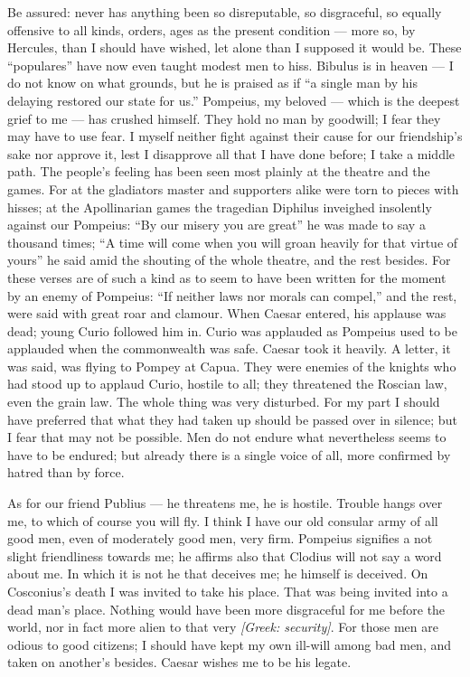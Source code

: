  Be assured: never has anything been so disreputable, so disgraceful, so equally offensive to all kinds, orders, ages as the present condition --- more so, by Hercules, than I should have wished, let alone than I supposed it would be. These ``populares'' have now even taught modest men to hiss. Bibulus is in heaven --- I do not know on what grounds, but he is praised as if ``a single man by his delaying restored our state for us.'' Pompeius, my beloved --- which is the deepest grief to me --- has crushed himself. They hold no man by goodwill; I fear they may have to use fear. I myself neither fight against their cause for our friendship's sake nor approve it, lest I disapprove all that I have done before; I take a middle path. The people's feeling has been seen most plainly at the theatre and the games. For at the gladiators master and supporters alike were torn to pieces with hisses; at the Apollinarian games the tragedian Diphilus inveighed insolently against our Pompeius: ``By our misery you are great'' he was made to say a thousand times; ``A time will come when you will groan heavily for that virtue of yours'' he said amid the shouting of the whole theatre, and the rest besides. For these verses are of such a kind as to seem to have been written for the moment by an enemy of Pompeius: ``If neither laws nor morals can compel,'' and the rest, were said with great roar and clamour. When Caesar entered, his applause was dead; young Curio followed him in. Curio was applauded as Pompeius used to be applauded when the commonwealth was safe. Caesar took it heavily. A letter, it was said, was flying to Pompey at Capua. They were enemies of the knights who had stood up to applaud Curio, hostile to all; they threatened the Roscian law, even the grain law. The whole thing was very disturbed. For my part I should have preferred that what they had taken up should be passed over in silence; but I fear that may not be possible. Men do not endure what nevertheless seems to have to be endured; but already there is a single voice of all, more confirmed by hatred than by force.

 As for our friend Publius --- he threatens me, he is hostile. Trouble hangs over me, to which of course you will fly. I think I have our old consular army of all good men, even of moderately good men, very firm. Pompeius signifies a not slight friendliness towards me; he affirms also that Clodius will not say a word about me. In which it is not he that deceives me; he himself is deceived. On Cosconius's death I was invited to take his place. That was being invited into a dead man's place. Nothing would have been more disgraceful for me before the world, nor in fact more alien to that very \textit{[Greek: security]}. For those men are odious to good citizens; I should have kept my own ill-will among bad men, and taken on another's besides. Caesar wishes me to be his legate.

